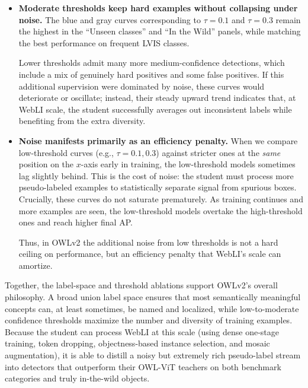 \begin{enrichment}
\begin{enrichment}
\begin{itemize}
			\item \textbf{Moderate thresholds keep hard examples without collapsing under noise.}
			The blue and gray curves corresponding to $\tau = 0.1$ and $\tau = 0.3$ remain the highest in the ``Unseen classes'' and ``In the Wild'' panels, while matching the best performance on frequent LVIS classes.
			
			Lower thresholds admit many more medium-confidence detections, which include a mix of genuinely hard positives and some false positives.
			If this additional supervision were dominated by noise, these curves would deteriorate or oscillate; instead, their steady upward trend indicates that, at WebLI scale, the student successfully averages out inconsistent labels while benefiting from the extra diversity.
			
			\item \textbf{Noise manifests primarily as an efficiency penalty.}
			When we compare low-threshold curves (e.g., $\tau = 0.1, 0.3$) against stricter ones at the \emph{same} position on the $x$-axis early in training, the low-threshold models sometimes lag slightly behind.
			This is the cost of noise: the student must process more pseudo-labeled examples to statistically separate signal from spurious boxes.
			Crucially, these curves do not saturate prematurely.
			As training continues and more examples are seen, the low-threshold models overtake the high-threshold ones and reach higher final AP.
			
			\newpage
			
			Thus, in OWLv2 the additional noise from low thresholds is not a hard ceiling on performance, but an efficiency penalty that WebLI's scale can amortize.
			
		\end{itemize}
		
		Together, the label-space and threshold ablations support OWLv2's overall philosophy.
		A broad union label space ensures that most semantically meaningful concepts can, at least sometimes, be named and localized, while low-to-moderate confidence thresholds maximize the number and diversity of training examples.
		Because the student can process WebLI at this scale (using dense one-stage training, token dropping, objectness-based instance selection, and mosaic augmentation), it is able to distill a noisy but extremely rich pseudo-label stream into detectors that outperform their OWL-ViT teachers on both benchmark categories and truly in-the-wild objects.
		
	\end{enrichment}
	

\end{enrichment}
